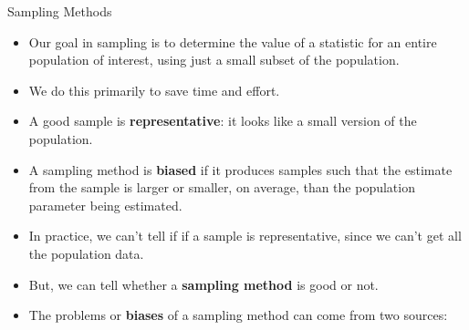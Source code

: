 \documentclass[handout]{beamer}
\begin{document}
\begin{frame}{Sampling Methods}
\scriptsize{


\begin{itemize}


 \item Our goal in sampling is to determine the value of a statistic for an entire population of interest, using just a small subset of the population.
 
\item We do this primarily to save time and effort.

\item A good sample is \textbf{representative}: it looks like a small version of the population.


\item A sampling method is \textbf{biased} if it produces samples such that the estimate from the sample is larger or smaller, on average, than the population parameter being estimated.


\item In practice, we can't tell if if a sample is representative, since we can't get all the population data.

\item But, we can tell whether a \textbf{sampling method} is good or not.


\item The problems or \textbf{biases} of a sampling method can come from two sources: 



\end{itemize}




} 
\end{frame}
\end{document}
